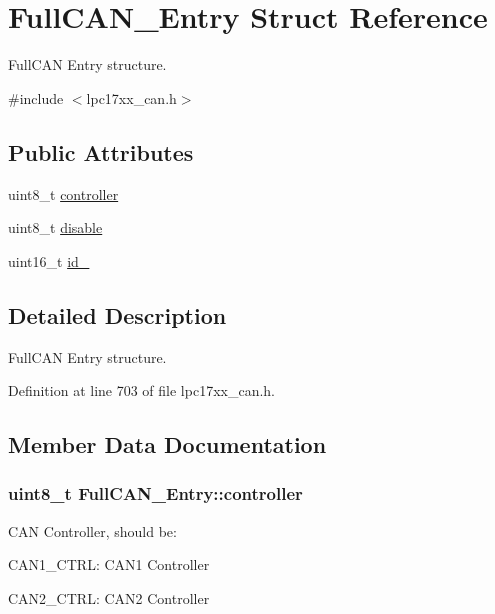 \hypertarget{struct_full_c_a_n___entry}{\section{\-Full\-C\-A\-N\-\_\-\-Entry \-Struct \-Reference}
\label{struct_full_c_a_n___entry}
}


\-Full\-C\-A\-N \-Entry structure.  




{\ttfamily \#include $<$lpc17xx\-\_\-can.\-h$>$}

\subsection*{\-Public \-Attributes}
\begin{DoxyCompactItemize}
\item 
uint8\-\_\-t \hyperlink{struct_full_c_a_n___entry_aca794e945487e21548fea03bd503288b}{controller}
\item 
uint8\-\_\-t \hyperlink{struct_full_c_a_n___entry_ab20e4f85051501294cf457415481bf0c}{disable}
\item 
uint16\-\_\-t \hyperlink{struct_full_c_a_n___entry_a9e09f31a75a386c226c9e681b9040566}{id\-\_}
\end{DoxyCompactItemize}


\subsection{\-Detailed \-Description}
\-Full\-C\-A\-N \-Entry structure. 

\-Definition at line 703 of file lpc17xx\-\_\-can.\-h.



\subsection{\-Member \-Data \-Documentation}
\hypertarget{struct_full_c_a_n___entry_aca794e945487e21548fea03bd503288b}{
\subsubsection[{controller}]{\setlength{\rightskip}{0pt plus 5cm}uint8\-\_\-t {\bf \-Full\-C\-A\-N\-\_\-\-Entry\-::controller}}}\label{struct_full_c_a_n___entry_aca794e945487e21548fea03bd503288b}
\-C\-A\-N \-Controller, should be\-:
\begin{DoxyItemize}
\item \-C\-A\-N1\-\_\-\-C\-T\-R\-L\-: \-C\-A\-N1 \-Controller
\item \-C\-A\-N2\-\_\-\-C\-T\-R\-L\-: \-C\-A\-N2 \-Controller 
\end{DoxyItemize}

